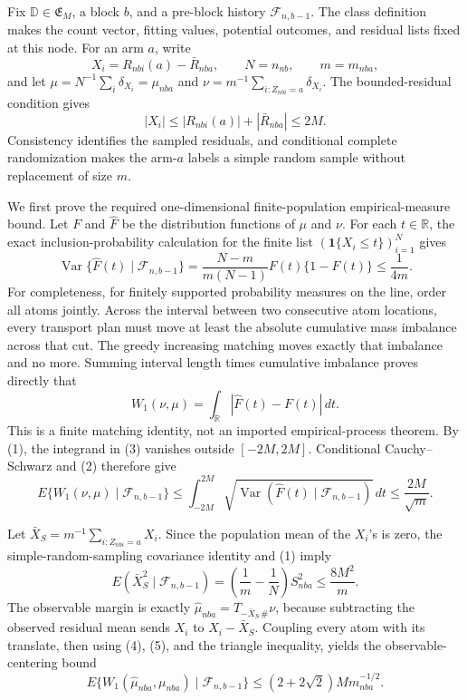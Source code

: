 Fix \(\mathbb D\in\mathfrak E_M\), a block \(b\), and a pre-block history \(\mathcal F_{n,b-1}\). The class definition makes the count vector, fitting values, potential outcomes, and residual lists fixed at this node. For an arm \(a\), write
\[
X_i=R_{nbi}(a)-\bar R_{nba},\qquad N=n_{nb},\qquad m=m_{nba},
\]
and let \(\mu=N^{-1}\sum_i\delta_{X_i}=\mu_{nba}\) and
\(\nu=m^{-1}\sum_{i:Z_{nbi}=a}\delta_{X_i}\). The bounded-residual condition gives
\[
|X_i|\le |R_{nbi}(a)|+|\bar R_{nba}|\le2M.
\tag{1}
\]
Consistency identifies the sampled residuals, and conditional complete randomization makes the arm-\(a\) labels a simple random sample without replacement of size \(m\).

We first prove the required one-dimensional finite-population empirical-measure bound. Let \(F\) and \(\widehat F\) be the distribution functions of \(\mu\) and \(\nu\). For each \(t\in\mathbb R\), the exact inclusion-probability calculation for the finite list \((\mathbf1\{X_i\le t\})_{i=1}^N\) gives
\[
\operatorname{Var}\{\widehat F(t)\mid\mathcal F_{n,b-1}\}
=\frac{N-m}{m(N-1)}F(t)\{1-F(t)\}\le\frac1{4m}.
\tag{2}
\]
For completeness, for finitely supported probability measures on the line, order all atoms jointly. Across the interval between two consecutive atom locations, every transport plan must move at least the absolute cumulative mass imbalance across that cut. The greedy increasing matching moves exactly that imbalance and no more. Summing interval length times cumulative imbalance proves directly that
\[
W_1(\nu,\mu)=\int_{\mathbb R}|\widehat F(t)-F(t)|\,dt.
\tag{3}
\]
This is a finite matching identity, not an imported empirical-process theorem. By (1), the integrand in (3) vanishes outside \([-2M,2M]\). Conditional Cauchy--Schwarz and (2) therefore give
\[
E\{W_1(\nu,\mu)\mid\mathcal F_{n,b-1}\}
\le\int_{-2M}^{2M}\sqrt{\operatorname{Var}(\widehat F(t)\mid\mathcal F_{n,b-1})}\,dt
\le\frac{2M}{\sqrt m}.
\tag{4}
\]

Let \(\bar X_S=m^{-1}\sum_{i:Z_{nbi}=a}X_i\). Since the population mean of the \(X_i\)'s is zero, the simple-random-sampling covariance identity and (1) imply
\[
E(\bar X_S^2\mid\mathcal F_{n,b-1})
=\left(\frac1m-\frac1N\right)S_{nba}^2
\le\frac{8M^2}{m}.
\tag{5}
\]
The observable margin is exactly
\(\widehat\mu_{nba}=T_{-\bar X_S\,\#}\nu\), because subtracting the observed residual mean sends \(X_i\) to \(X_i-\bar X_S\). Coupling every atom with its translate, then using (4), (5), and the triangle inequality, yields the observable-centering bound
\[
E\{W_1(\widehat\mu_{nba},\mu_{nba})\mid\mathcal F_{n,b-1}\}
\le (2+2\sqrt2)M m_{nba}^{-1/2}.
\tag{6}
\]

